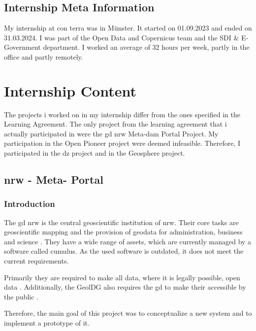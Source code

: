\documentclass[11pt, titlepage, a4paper]{article}
\begin{document}
\subsection{Internship Meta Information}

My internship at con terra was in Münster. It started on 01.09.2023 and ended on 31.03.2024. I was part of the Open Data and Copernicus team and the SDI \& E-Government department. I worked an average of 32 hours per week, partly in the office and partly remotely.

\section{Internship Content}
The projects i worked on in my internship differ from the ones specified in the Learning Agreement. The only project from the learning agreement that i actually participated in were the \gls{gd} \gls{nrw} Meta-\gls{dam} Portal Project. My participation in the Open Pioneer \cite{conterraOpenPioneerTrails2024} project were deemed infeasible. Therefore, I participated in the \gls {dz} project and in the Geosphere project.

\subsection{ \gls{nrw} -  Meta- Portal }
\subsubsection{Introduction}
The  \gls {gd} \gls {nrw}  is the central geoscientific institution of \gls {nrw}. Their  core tasks are geoscientific mapping and the provision of geodata for administration, business and science \cite{GeoDatenFurNordrheinWestfalen2024}.
They have a wide range of assets, which are currently managed by a software called cumulus. As the used software is outdated, it does not meet the current requirements.

Primarily they  are required to make all data, where it is legally possible, open data \cite{GesetzZurForderung2017}.
Additionally, the GeolDG also requires the \gls{gd} to make their accessible by the public \cite{GesetzZurStaatlichen2020}.

Therefore, the main goal of this project was to conceptualize a new system and to implement a prototype of it.
\end{document}
